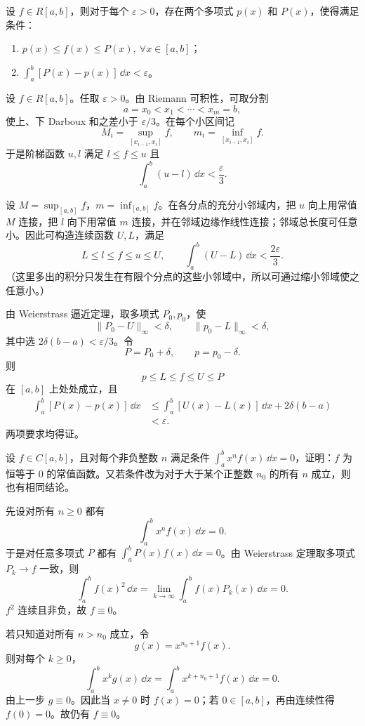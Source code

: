 \begin{xexercise}[3]
设 $f\in R[a,b]$，则对于每个 $\varepsilon>0$，存在两个多项式 $p(x)$ 和 $P(x)$，使得满足条件：
\begin{enumerate}[label=(\arabic*)]
\item $p(x)\leqslant f(x)\leqslant P(x),\ \forall x\in[a,b]$；
\item $\displaystyle\int_a^b[P(x)-p(x)]\,\dd x<\varepsilon$。
\end{enumerate}
\end{xexercise}
\begin{xsolution}
设 $f\in R[a,b]$。任取 $\varepsilon>0$。由 Riemann 可积性，可取分割
\[
  a=x_0<x_1<\cdots<x_m=b,
\]
使上、下 Darboux 和之差小于 $\varepsilon/3$。在每个小区间记
\[
  M_i=\sup_{[x_{i-1},x_i]}f,
  \qquad m_i=\inf_{[x_{i-1},x_i]}f.
\]
于是阶梯函数 $u,l$ 满足 $l\leqslant f\leqslant u$ 且
\[
  \int_a^b(u-l)\,\dd x<\frac\varepsilon3.
\]

设 $M=\sup_{[a,b]}f$，$m=\inf_{[a,b]}f$。在各分点的充分小邻域内，把 $u$ 向上用常值 $M$ 连接，把 $l$ 向下用常值 $m$ 连接，并在邻域边缘作线性连接；邻域总长度可任意小。因此可构造连续函数 $U,L$，满足
\[
  L\leqslant l\leqslant f\leqslant u\leqslant U,
  \qquad
  \int_a^b(U-L)\,\dd x<\frac{2\varepsilon}{3}.
\]
（这里多出的积分只发生在有限个分点的这些小邻域中，所以可通过缩小邻域使之任意小。）

由 Weierstrass 逼近定理，取多项式 $P_0,p_0$，使
\[
  \|P_0-U\|_\infty<\delta,
  \qquad \|p_0-L\|_\infty<\delta,
\]
其中选 $2\delta(b-a)<\varepsilon/3$。令
\[
  P=P_0+\delta,\qquad p=p_0-\delta.
\]
则
\[
  p\leqslant L\leqslant f\leqslant U\leqslant P
\]
在 $[a,b]$ 上处处成立，且
\[
\begin{aligned}
  \int_a^b[P(x)-p(x)]\,\dd x
  &\leqslant\int_a^b[U(x)-L(x)]\,\dd x+2\delta(b-a)\\
  &<\varepsilon.
\end{aligned}
\]
两项要求均得证。
\end{xsolution}


\begin{xexercise}[4]
设 $f\in C[a,b]$，且对每个非负整数 $n$ 满足条件 $\int_a^b x^nf(x)\,\dd x=0$，证明：$f$ 为恒等于 0 的常值函数。又若条件改为对于大于某个正整数 $n_0$ 的所有 $n$ 成立，则也有相同结论。
\end{xexercise}
\begin{xsolution}
先设对所有 $n\geqslant0$ 都有
\[
  \int_a^bx^nf(x)\,\dd x=0.
\]
于是对任意多项式 $P$ 都有 $\int_a^bP(x)f(x)\,\dd x=0$。由 Weierstrass 定理取多项式 $P_k\to f$ 一致，则
\[
  \int_a^bf(x)^2\,\dd x
  =\lim_{k\to\infty}\int_a^bf(x)P_k(x)\,\dd x=0.
\]
$f^2$ 连续且非负，故 $f\equiv0$。

若只知道对所有 $n>n_0$ 成立，令
\[
  g(x)=x^{n_0+1}f(x).
\]
则对每个 $k\geqslant0$，
\[
  \int_a^bx^kg(x)\,\dd x
  =\int_a^bx^{k+n_0+1}f(x)\,\dd x=0.
\]
由上一步 $g\equiv0$。因此当 $x\ne0$ 时 $f(x)=0$；若 $0\in[a,b]$，再由连续性得 $f(0)=0$。故仍有 $f\equiv0$。
\end{xsolution}


